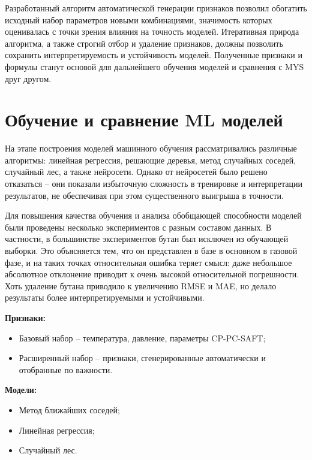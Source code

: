 \documentclass[a4paper,12pt]{article}
\begin{document}
    Разработанный алгоритм автоматической генерации признаков позволил обогатить исходный набор параметров новыми комбинациями, значимость которых оценивалась с точки зрения влияния на точность моделей. Итеративная природа алгоритма, а также строгий отбор и удаление признаков, должны позволить сохранить интерпретируемость и устойчивость моделей. Полученные признаки и формулы станут основой для дальнейшего обучения моделей и сравнения с MYS друг другом.
\newpage

\section{Обучение и сравнение ML моделей}

  На этапе построения моделей машинного обучения рассматривались различные алгоритмы: линейная регрессия, решающие деревья, метод случайных соседей, случайный лес, а также нейросети. Однако от нейросетей было решено отказаться -- они показали избыточную сложность в тренировке и интерпретации результатов, не обеспечивая при этом существенного выигрыша в точности.
  
  Для повышения качества обучения и анализа обобщающей способности моделей были проведены несколько экспериментов с разным составом данных. В частности, в большинстве экспериментов бутан был исключен из обучающей выборки. Это объясняется тем, что он представлен в базе в основном в газовой фазе, и на таких точках относительная ошибка теряет смысл: даже небольшое абсолютное отклонение приводит к очень высокой относительной погрешности. Хоть удаление бутана приводило к увеличению RMSE и MAE, но делало результаты более интерпретируемыми и устойчивыми.
  
  \begin{minipage}{\textwidth}
    \textbf{Признаки:}
    \begin{itemize}
      \item Базовый набор -- температура, давление, параметры CP-PC-SAFT;
      \item Расширенный набор -- признаки, сгенерированные автоматически и отобранные по важности.
    \end{itemize}
  \end{minipage}
  
  \begin{minipage}{\textwidth}
    \textbf{Модели:}
    \begin{itemize}
      \item Метод ближайших соседей;
      \item Линейная регрессия;
      \item Случайный лес.
    \end{itemize}
  \end{minipage}
  
\end{document}
